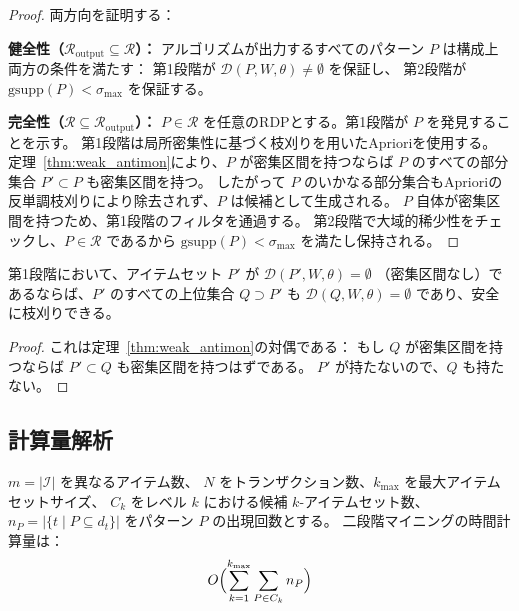 \begin{proof}
両方向を証明する：

\textbf{健全性（$\mathcal{R}_{\text{output}} \subseteq \mathcal{R}$）：}
アルゴリズムが出力するすべてのパターン $P$ は構成上両方の条件を満たす：
第1段階が $\mathcal{D}(P, W, \theta) \neq \emptyset$ を保証し、
第2段階が $\text{gsupp}(P) < \sigma_{\max}$ を保証する。

\textbf{完全性（$\mathcal{R} \subseteq \mathcal{R}_{\text{output}}$）：}
$P \in \mathcal{R}$ を任意のRDPとする。第1段階が $P$ を発見することを示す。
第1段階は局所密集性に基づく枝刈りを用いたAprioriを使用する。
定理~\ref{thm:weak_antimon}により、$P$ が密集区間を持つならば $P$ のすべての部分集合 $P' \subset P$ も密集区間を持つ。
したがって $P$ のいかなる部分集合もAprioriの反単調枝刈りにより除去されず、$P$ は候補として生成される。
$P$ 自体が密集区間を持つため、第1段階のフィルタを通過する。
第2段階で大域的稀少性をチェックし、$P \in \mathcal{R}$ であるから $\text{gsupp}(P) < \sigma_{\max}$ を満たし保持される。
\end{proof}

\begin{theorem}[枝刈りの正当性]\label{thm:pruning}
第1段階において、アイテムセット $P'$ が $\mathcal{D}(P', W, \theta) = \emptyset$
（密集区間なし）であるならば、$P'$ のすべての上位集合 $Q \supset P'$ も
$\mathcal{D}(Q, W, \theta) = \emptyset$ であり、安全に枝刈りできる。
\end{theorem}

\begin{proof}
これは定理~\ref{thm:weak_antimon}の対偶である：
もし $Q$ が密集区間を持つならば $P' \subset Q$ も密集区間を持つはずである。
$P'$ が持たないので、$Q$ も持たない。
\end{proof}

\subsection{計算量解析}

\begin{theorem}[時間計算量]\label{thm:complexity}
$m = |\mathcal{I}|$ を異なるアイテム数、
$N$ をトランザクション数、$k_{\max}$ を最大アイテムセットサイズ、
$C_k$ をレベル $k$ における候補 $k$-アイテムセット数、
$n_P = |\{t \mid P \subseteq d_t\}|$ をパターン $P$ の出現回数とする。
二段階マイニングの時間計算量は：
\begin{equation}
O\Bigl(\sum_{k=1}^{k_{\max}} \sum_{P \in C_k} n_P\Bigr)
\end{equation}
\end{theorem}

